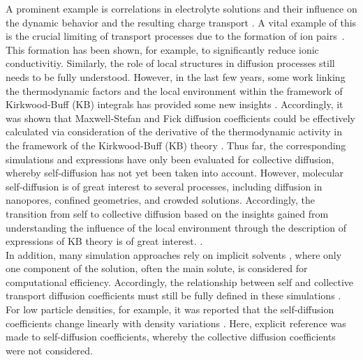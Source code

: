 \documentclass[aip,jcp,reprint]{revtex4-1}
\begin{document}
A prominent example is correlations in electrolyte solutions and their influence on the dynamic behavior and the resulting charge transport \cite{kashyap11a,smiatek18a}.
A vital example of this is the crucial limiting of transport processes due to the formation of ion pairs~\cite{marcus06a,vanderVegt16a,smiatek18a,smiatek20a,narayanan18a,smiatek20b,miranda20a,yang20a,krishnamoorthy18b,smiatek19a}.
This formation has been shown, for example, to significantly reduce ionic conductivitiy\cite{schroder09a,krishnamoorthy16a,smiatek18a,smiatek20a,krishnamoorthy18c,nandy19a}.
Similarly, the role of local structures in diffusion processes still needs to be fully understood. However, in the last few years, some work linking the thermodynamic factors and the local environment within the framework of Kirkwood-Buff (KB) integrals has provided some new insights \cite{bardow15a,guevara16a,janzen17a,liu11a,liu13a,rosenberger20a}. Accordingly, it was shown that Maxwell-Stefan and Fick diffusion coefficients could be effectively calculated via consideration of the derivative of the thermodynamic activity in the framework of the Kirkwood-Buff (KB) theory \cite{bardow15a,guevara16a,janzen17a,liu11a,liu13a,rosenberger20a,kirkwood51,ben13a,pierce08a,smith06,smiatek17a,zingrebe18b,simon22a}. Thus far, the corresponding simulations and expressions have only been evaluated for collective diffusion, whereby self-diffusion has not yet been taken into account. However, molecular self-diffusion is of great interest to several processes, including diffusion in nanopores, confined geometries, and crowded solutions. Accordingly, the transition from self to collective diffusion based on the insights gained from understanding the influence of the local environment through the description of expressions of KB theory is of great interest. \cite{simon22a,jamali18a,jamali20a,roosen11a,dix08a}. \\
In addition, many simulation approaches rely on implicit solvents \cite{roux99a,onufriev08a}, where only one component of the solution, often the main solute, is considered for computational efficiency. Accordingly, the relationship between self and collective transport diffusion coefficients must still be fully defined in these simulations \cite{kalz22a,lowen93a,medina88a}. For low particle densities, for example, it was reported that the self-diffusion coefficients change linearly with density variations \cite{kalz22a,batchelor76a,felderhof78a,hanna82a}. Here, explicit reference was made to self-diffusion coefficients, whereby the collective diffusion coefficients were not considered. \\
\end{document}

